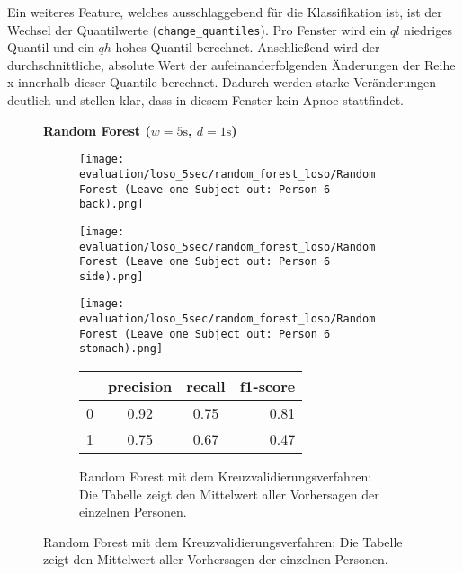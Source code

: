 Ein weiteres Feature, welches ausschlaggebend für die Klassifikation ist, ist der Wechsel der Quantilwerte (\texttt{change\_quantiles}).
Pro Fenster wird ein $ql$ niedriges Quantil und ein $qh$ hohes Quantil berechnet. 
Anschließend wird der durchschnittliche, absolute Wert der aufeinanderfolgenden Änderungen der Reihe x innerhalb dieser Quantile berechnet.
Dadurch werden starke Veränderungen deutlich und stellen klar, dass in diesem Fenster kein Apnoe stattfindet. 


\begin{figure}[H]
  \textbf{Random Forest ($w=5\si{\s}$, $d=1\si{\s}$)}
    \centering
    \begin{subfigure}{1\textwidth}
        \texttt{[image: evaluation/loso\_5sec/random\_forest\_loso/Random Forest (Leave one Subject out: Person 6 back).png]}
      \end{subfigure}
      \begin{subfigure}{1\textwidth}
        \texttt{[image: evaluation/loso\_5sec/random\_forest\_loso/Random Forest (Leave one Subject out: Person 6 side).png]}
      \end{subfigure}
      \begin{subfigure}{1\textwidth}
        \texttt{[image: evaluation/loso\_5sec/random\_forest\_loso/Random Forest (Leave one Subject out: Person 6 stomach).png]}
    \end{subfigure}
    \begin{subfigure}{1\textwidth}
        \begin{center}
            \begin{tabular}{ | l | c | c | r | }
              \hline
               & precision & recall & f1-score\\ \hline
              0 & 0.92 & 0.75 & 0.81 \\ \hline
              1 & 0.75 & 0.67 & 0.47 \\
              \hline
            \end{tabular}
        \end{center}
        \caption{Random Forest mit dem Kreuzvalidierungsverfahren: Die Tabelle zeigt den Mittelwert aller Vorhersagen der einzelnen Personen.}
        \label{implementation:app:screenshots:user_studies_information}

\end{subfigure}
\end{figure}
